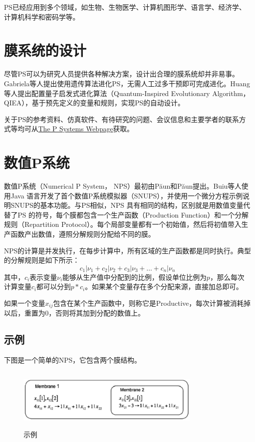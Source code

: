 PS已经应用到多个领域，如生物、生物医学、计算机图形学、语言学、经济学、计算机科学和密码学等\cite{zhang2010nature}。

\section{膜系统的设计}
尽管PS可以为研究人员提供各种解决方案，设计出合理的膜系统却并非易事。Gabriela等人\cite{escuela2010application}提出使用遗传算法进化PS，无需人工过多干预即可完成进化。Huang等人\cite{huang2012evolutionary}提出配置量子启发式进化算法（Quantum-Inspired Evolutionary Algorithm，QIEA），基于预先定义的变量和规则，实现PS的自动设计。

关于PS的参考资料、仿真软件、有待研究的问题、会议信息和主要学者的联系方式等均可从\href{http://ppage.psystems.eu/}{The P Systems Webpage}获取。

\section{数值P系统}
数值P系统（Numerical P System， NPS）最初由P{\u{a}}un和P{\u{a}}un\cite{paun2006introduction,paun2006membrane}提出。Buiu等人\cite{buiu2011software}使用Java 语言开发了首个数值P系统模拟器（SNUPS），并使用一个微分方程示例说明SNUPS的基本功能。与PS相似，NPS 具有相同的结构，区别就是用数值变量代替了PS 的符号，每个膜都包含一个生产函数（Production Function）和一个分解规则（Repartition Protocol）。每个局部变量都有一个初始值，然后将初值带入生产函数产出数值，遵照分解规则分配给不同的膜。

NPS的计算是并发执行，在每步计算中，所有区域的生产函数都是同时执行。典型的分解规则是如下所示：
\[c_1|\nu_1 + c_2|\nu_2 + c_3|\nu_3 + \dots + c_n|\nu_n\]
其中，$c_i$表示变量$\nu_i$能够从生产值中分配到的比例，假设单位比例为$p$，那么每次计算变量$c_i$都可以分到$p*c_i$。如果某个变量存在多个分配来源，直接加总即可。

如果一个变量$x_{ij}$包含在某个生产函数中，则称它是Productive，每次计算被消耗掉以后，重置为0，否则将其加到分配的数值上。

\subsection{示例}
下图是一个简单的NPS，它包含两个膜结构。
\begin{figure}[htbp]
\centering
\includegraphics[width=0.8\textwidth, height=3cm]{figures/membraneinstance.eps}
\caption{示例\cite{buiu2012development}}
\end{figure}


